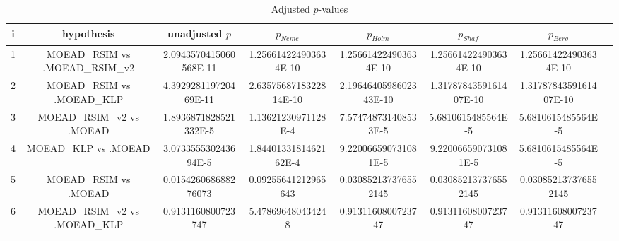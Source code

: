 \documentclass[a4paper,10pt]{article}
\begin{document}
\begin{landscape}
\begin{table}[!htp]
\centering\tiny
\caption{Adjusted $p$-values}
\begin{tabular}{cccccccc}
i&hypothesis&unadjusted $p$&$p_{Neme}$&$p_{Holm}$&$p_{Shaf}$&$p_{Berg}$\\
\hline
1&MOEAD_RSIM vs .MOEAD_RSIM_v2&2.0943570415060568E-11&1.256614224903634E-10&1.256614224903634E-10&1.256614224903634E-10&1.256614224903634E-10\\
2&MOEAD_RSIM vs .MOEAD_KLP&4.392928119720469E-11&2.6357568718322814E-10&2.1964640598602343E-10&1.3178784359161407E-10&1.3178784359161407E-10\\
3&MOEAD_RSIM_v2 vs .MOEAD&1.8936871828521332E-5&1.13621230971128E-4&7.574748731408533E-5&5.6810615485564E-5&5.6810615485564E-5\\
4&MOEAD_KLP vs .MOEAD&3.073355530243694E-5&1.8440133181462162E-4&9.220066590731081E-5&9.220066590731081E-5&5.6810615485564E-5\\
5&MOEAD_RSIM vs .MOEAD&0.015426068688276073&0.09255641212965643&0.030852137376552145&0.030852137376552145&0.030852137376552145\\
6&MOEAD_RSIM_v2 vs .MOEAD_KLP&0.9131160800723747&5.478696480434248&0.9131160800723747&0.9131160800723747&0.9131160800723747\\
\hline
\end{tabular}
\end{table}

\end{landscape}
\end{document}
